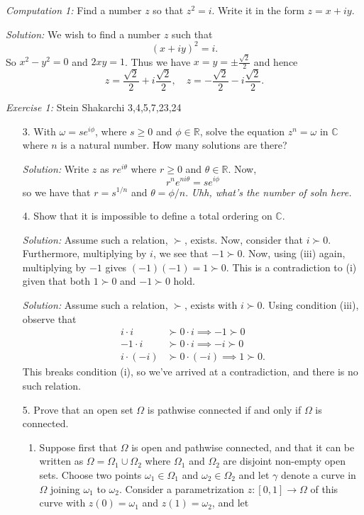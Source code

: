 \documentclass{article}
\newcommand{\comp}[2]{
\vspace{0.2in}\begin{mdframed}[
  backgroundcolor=problem,
  skipabove=\topsep,
  skipbelow=\topsep
  ]
  \emph{Computation {#1}:} {#2}
\end{mdframed}}
\newcommand{\exercise}[2]{
\vspace{0.2in}\begin{mdframed}[
  backgroundcolor=problem,
  skipabove=\topsep,
  skipbelow=\topsep
  ]
  \emph{Exercise {#1}:} {#2}
\end{mdframed}}
\newcommand{\R}{\mathbb{R}}
\newcommand{\C}{\mathbb{C}}
\begin{document}
    \comp{1}{Find a number $z$ so that $z^2=i$. Write it in the form $z=x+iy$.}
    \textit{Solution:} We wish to find a number $z$ such that
    \[ (x+iy)^2 = i.\]
    So $x^2-y^2=0$ and $2xy=1$. Thus we have $x=y=\pm\frac{\sqrt{2}}{2}$ and hence
    \[z=\frac{\sqrt{2}}{2} + i\frac{\sqrt{2}}{2},\quad z = -\frac{\sqrt{2}}{2} - i\frac{\sqrt{2}}{2}.\]
    \exercise{1}{Stein Shakarchi 3,4,5,7,23,24}
    \begin{enumerate}
      \item[3.] With $\omega = se^{i\phi}$, where $s\ge 0$ and $\phi\in \R$, solve the equation $z^n = \omega$ in $\C$ where $n$ is a natural number. How many solutions are there?
      \item[] \textit{Solution:} Write $z$ as $re^{i\theta}$ where $r\ge 0$ and $\theta\in \R$. Now,
      \[ r^n e^{ni\theta} = se^{i\phi}\] 
      so we have that $r = s^{1/n}$ and $\theta = \phi / n$. \textit{Uhh, what's the number of soln here.}
      \item[4.] Show that it is impossible to define a total ordering on $\C$.
      \item[] \textit{Solution:} Assume such a relation, $\succ$, exists. Now, consider that $i \succ 0$. Furthermore, multiplying by $i$, we see that $-1 \succ 0$. Now, using (iii) again, multiplying by $-1$ gives $(-1)(-1) = 1 \succ 0$. This is a contradiction to (i) given that both $1 \succ 0$ and $-1\succ 0$ hold.
      \item[] \textit{Solution:} Assume such a relation, $\succ$, exists with $i\succ 0$. Using condition (iii), observe that 
      \begin{align*}
        i\cdot i &\succ 0\cdot i \implies -1 \succ 0\\
        -1 \cdot i &\succ 0 \cdot i \implies -i\succ 0\\
        i \cdot (-i) &\succ 0\cdot (-i) \implies 1 \succ 0.
      \end{align*}
      This breaks condition (i), so we've arrived at a contradiction, and there is no such relation.
      \item[5.] Prove that an open set $\Omega$ is pathwise connected if and only if $\Omega$ is connected.
      \begin{enumerate}
        \item Suppose first that $\Omega$ is open and pathwise connected, and that it can be written as $\Omega = \Omega_1 \cup \Omega_2$ where $\Omega_1$ and $\Omega_2$ are disjoint non-empty open sets. Choose two points $\omega_1\in\Omega_1$ and $\omega_2\in\Omega_2$ and let $\gamma$ denote a curve in $\Omega$ joining $\omega_1$ to $\omega_2$. Consider a parametrization $z:[0,1]\to\Omega$ of this curve with $z(0)=\omega_1$ and $z(1)=\omega_2$, and let

\end{enumerate}
\end{enumerate}
\end{document}
